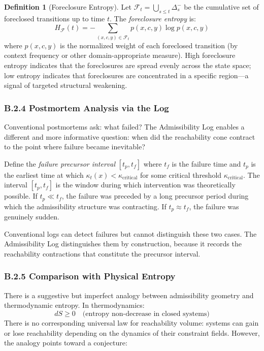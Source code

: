 \documentclass[12pt, a4paper]{article}
\theoremstyle{plain}
\theoremstyle{definition}
\newtheorem{definition}[theorem]{Definition}
\theoremstyle{remark}
\begin{document}
\begin{definition}[Foreclosure Entropy]
Let $\mathcal{F}_t = \bigcup_{s \leq t} \Delta_s^-$ be the cumulative set
of foreclosed transitions up to time $t$. The \emph{foreclosure entropy} is:
$$H_{\mathcal{F}}(t) = -\sum_{(x,c,y) \in \mathcal{F}_t} p(x,c,y) \log p(x,c,y)$$
where $p(x,c,y)$ is the normalized weight of each foreclosed transition
(by context frequency or other domain-appropriate measure). High foreclosure
entropy indicates that the foreclosures are spread evenly across the state
space; low entropy indicates that foreclosures are concentrated in a specific
region---a signal of targeted structural weakening.
\end{definition}

\subsubsection*{B.2.4 Postmortem Analysis via the Log}

Conventional postmortems ask: what failed? The Admissibility Log enables
a different and more informative question: when did the reachability cone
contract to the point where failure became inevitable?

Define the \emph{failure precursor interval} $[t_p, t_f]$ where $t_f$ is
the failure time and $t_p$ is the earliest time at which $\kappa_t(x) <
\kappa_{\text{critical}}$ for some critical threshold $\kappa_{\text{critical}}$.
The interval $[t_p, t_f]$ is the window during which intervention was
theoretically possible. If $t_p \ll t_f$, the failure was preceded by a
long precursor period during which the admissibility structure was contracting.
If $t_p \approx t_f$, the failure was genuinely sudden.

Conventional logs can detect failures but cannot distinguish these two cases.
The Admissibility Log distinguishes them by construction, because it records
the reachability contractions that constitute the precursor interval.

\subsubsection*{B.2.5 Comparison with Physical Entropy}

There is a suggestive but imperfect analogy between admissibility geometry
and thermodynamic entropy. In thermodynamics:
$$dS \geq 0 \quad \text{(entropy non-decrease in closed systems)}$$
There is no corresponding universal law for reachability volume: systems
can gain or lose reachability depending on the dynamics of their constraint
fields. However, the analogy points toward a conjecture:
\end{document}
